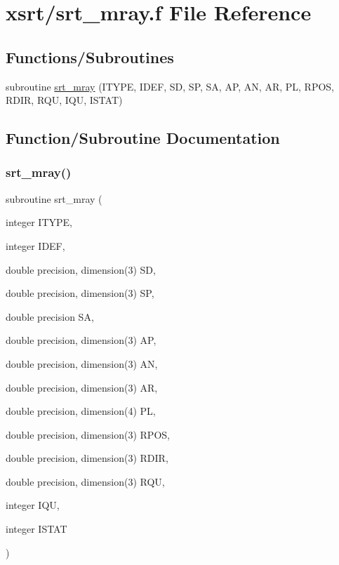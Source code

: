 \hypertarget{srt__mray_8f}{}\section{xsrt/srt\+\_\+mray.f File Reference}
\label{srt__mray_8f}
\subsection*{Functions/\+Subroutines}
\begin{DoxyCompactItemize}
\item 
subroutine \hyperlink{srt__mray_8f_a795b05d30e2ec2d09f0c71e071a9a9fd}{srt\+\_\+mray} (I\+T\+Y\+PE, I\+D\+EF, SD, SP, SA, AP, AN, AR, PL, R\+P\+OS, R\+D\+IR, R\+QU, I\+QU, I\+S\+T\+AT)
\end{DoxyCompactItemize}


\subsection{Function/\+Subroutine Documentation}
\mbox{\label{srt__mray_8f_a795b05d30e2ec2d09f0c71e071a9a9fd}} 
\subsubsection{\texorpdfstring{srt\+\_\+mray()}{srt\_mray()}}
{\footnotesize\ttfamily subroutine srt\+\_\+mray (\begin{DoxyParamCaption}\item[{integer}]{I\+T\+Y\+PE,  }\item[{integer}]{I\+D\+EF,  }\item[{double precision, dimension(3)}]{SD,  }\item[{double precision, dimension(3)}]{SP,  }\item[{double precision}]{SA,  }\item[{double precision, dimension(3)}]{AP,  }\item[{double precision, dimension(3)}]{AN,  }\item[{double precision, dimension(3)}]{AR,  }\item[{double precision, dimension(4)}]{PL,  }\item[{double precision, dimension(3)}]{R\+P\+OS,  }\item[{double precision, dimension(3)}]{R\+D\+IR,  }\item[{double precision, dimension(3)}]{R\+QU,  }\item[{integer}]{I\+QU,  }\item[{integer}]{I\+S\+T\+AT }\end{DoxyParamCaption})}

